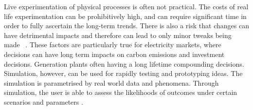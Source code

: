Live experimentation of physical processes is often not practical. The costs of real life experimentation can be prohibitively high, and can require significant time in order to fully ascertain the long-term trends. There is also a risk that changes can have detrimental impacts and therefore can lead to only minor tweaks being made ~\cite{Forshaw2016}. These factors are particularly true for electricity markets, where decisions can have long term impacts on carbon emissions and investment decisions. Generation plants often having a long lifetime compounding decisions. Simulation, however, can be used for rapidly testing and prototyping ideas. The simulation is parametrised by real world data and phenomena. Through simulation, the user is able to assess the likelihoods of outcomes under certain scenarios and parameters \cite{Law:603360}.


